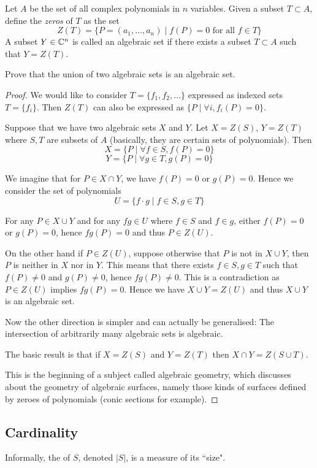 \begin{prbm}
Let $A$ be the set of all complex polynomials in $n$ variables. Given a subset $T \subset A$, define the \textit{zeros} of $T$ as the set
\[ Z(T) = \{P=(a_1,\dots,a_n) \mid f(P)=0 \text{ for all } f \in T\} \]
A subset $Y \in \mathbb C^n$ is called an algebraic set if there exists a subset $T \subset A$ such that $Y=Z(T)$.

Prove that the union of two algebraic sets is an algebraic set.
\end{prbm}
\begin{proof}
We would like to consider $T=\{f_1, f_2, \dots\}$ expressed as indexed sets $T=\{f_i\}$. Then $Z(T)$ can also be expressed as $\{P \mid \forall i, f_i(P)=0\}$.

Suppose that we have two algebraic sets $X$ and $Y$. Let $X=Z(S)$, $Y=Z(T)$ where $S,T$ are subsets of $A$ (basically, they are certain sets of polynomials). Then
\[ X=\{P \mid \forall f \in S, f(P)=0\} \]
\[ Y=\{P \mid \forall g \in T, g(P)=0\} \]

We imagine that for $P\in X\cap Y$, we have $f(P)=0$ or $g(P)=0$. Hence we consider the set of polynomials
\[ U=\{f\cdot g \mid f\in S, g\in T\} \]

For any $P\in X\cup Y$ and for any $fg\in U$ where $f\in S$ and $f\in g$, either $f(P)=0$ or $g(P)=0$, hence $fg(P)=0$ and thus $P\in Z(U)$.

On the other hand if $P\in Z(U)$, suppose otherwise that $P$ is not in $X\cup Y$, then $P$ is neither in $X$ nor in $Y$. This means that there exists $f\in S,g\in T$ such that $f(P)\neq0$ and $g(P)\neq0$, hence $fg(P)\neq0$. This is a contradiction as $P\in Z(U)$ implies $fg(P)=0$. Hence we have $X\cup Y=Z(U)$ and thus $X\cup Y$ is an algebraic set.

Now the other direction is simpler and can actually be generalised: The intersection of arbitrarily many algebraic sets is algebraic. 

The basic result is that if $X=Z(S)$ and $Y=Z(T)$ then $X\cap Y=Z(S\cup T)$. 

This is the beginning of a subject called algebraic geometry, which discusses about the geometry of algebraic surfaces, namely those kinds of surfaces defined by zeroes of polynomials (conic sections for example).
\end{proof}

\subsection{Cardinality}
Informally, the  of $S$, denoted $|S|$, is a measure of its ``size".

